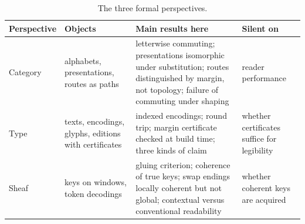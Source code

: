 \begin{table}[ht]
\centering
\small
\renewcommand{\arraystretch}{1.25}
\begin{tabular}{>{\raggedright\arraybackslash}p{2.0cm}>{\raggedright\arraybackslash}p{3.3cm}>{\raggedright\arraybackslash}p{4.6cm}>{\raggedright\arraybackslash}p{3.0cm}}
\toprule
Perspective & Objects & Main results here & Silent on\\
\midrule
Category & alphabets, presentations, routes as paths & letterwise commuting; presentations isomorphic under substitution; routes distinguished by margin, not topology; failure of commuting under shaping & reader performance\\
Type & texts, encodings, glyphs, editions with certificates & indexed encodings; round trip; margin certificate checked at build time; three kinds of claim & whether certificates suffice for legibility\\
Sheaf & keys on windows, token decodings & gluing criterion; coherence of true keys; swap endings locally coherent but not global; contextual versus conventional readability & whether coherent keys are acquired\\
\bottomrule
\end{tabular}
\caption{The three formal perspectives.}\label{tab:formal}
\end{table}
